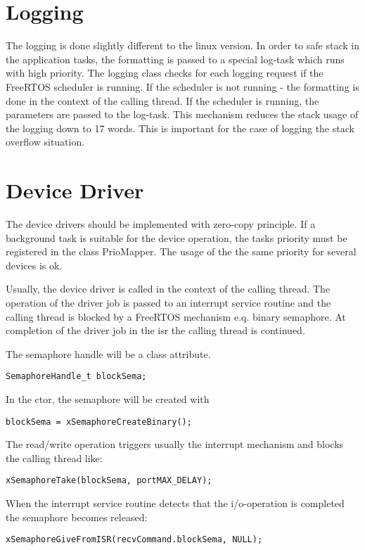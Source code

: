 \section{Logging}
The logging is done slightly different to the linux version.
In order to safe stack in the application tasks, the formatting is passed
to a special log-task which runs with high priority.
The logging class checks for each logging request if the FreeRTOS scheduler
is running. If the scheduler is not running - the formatting is done in the 
context of the calling thread. If the scheduler is running, the parameters
are passed to the log-task.
This mechanism reduces the stack usage of the logging down to 17 words. This
is important for the case of logging the stack overflow situation.


\section{Device Driver}
\label{sec_microcontroller_devicedriver}

The device drivers should be implemented with zero-copy principle.
If a background task is suitable for the device operation, the 
tasks priority must be registered in the class PrioMapper. The usage
of the the same priority for several devices is ok.

Usually, the device driver is called in the context of the calling thread.
The operation of the driver job is passed to an interrupt service routine and
the calling thread is blocked by a FreeRTOS mechanism e.q. binary semaphore.
At completion of the driver job in the isr the calling thread is continued.

The semaphore handle will be a class attribute.
\begin{verbatim}
SemaphoreHandle_t blockSema;
\end{verbatim}

 In the ctor,
the semaphore will be created with 
\begin{verbatim}
blockSema = xSemaphoreCreateBinary();
\end{verbatim}

The read/write operation triggers usually the interrupt mechanism and blocks
the calling thread like:
\begin{verbatim}
xSemaphoreTake(blockSema, portMAX_DELAY);
\end{verbatim}


When the interrupt service routine detects that the i/o-operation is completed
the semaphore becomes released:
\begin{verbatim}
xSemaphoreGiveFromISR(recvCommand.blockSema, NULL);
\end{verbatim}

